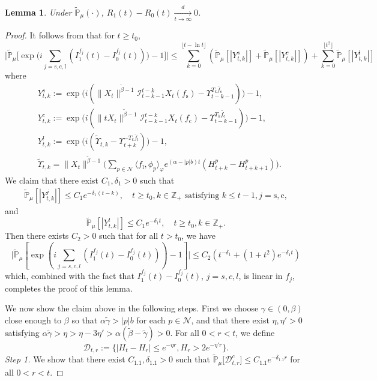 \documentclass[12pt,a4paper]{amsart}
\theoremstyle{plain}
\newtheorem{lem}[thm]{Lemma}
\theoremstyle{definition}
\numberwithin{equation}{section}
\begin{document}
\begin{lem}\label{lem: U1-U0T}
Under $\mathbb{\widetilde{P}}_{\mu}(\cdot)$,
 $R_1(t)-R_0(t)\xrightarrow[t\to \infty]{d}0$.
\end{lem}
\begin{proof}
It follows from \cite[Lemma 3.4.3]{Durrett2010Probability} that for $t\geq t_0$,
\[
\Big|\widetilde {\mathbb P}_{\mu}\Big[\exp\Big(i
\sum_{j=\mathrm s,\mathrm c,\mathrm l}(I_{1}^{f_j}(t) - I_0^{f_j}(t))\Big)
 - 1\Big]\Big| \leq  \sum_{k=0}^{\lfloor t-\ln t \rfloor}(\widetilde {\mathbb {P}}_\mu[|Y^s_{t,k}|] + \widetilde {\mathbb {P}}_\mu[|Y^c_{t,k}|] )+ \sum_{k=0}^{\lfloor t^2 \rfloor} \widetilde {\mathbb {P}}_\mu[|Y^l_{t,k}|]
\]
 where
 \begin{align}
 &Y^s_{t,k} := \exp\Big(i(\|X_t\|^{\tilde{\beta}-1}\mathcal I_{t-k-1}^{t-k}X_t(f_\mathrm s) - \Upsilon_{t-k-1}^{T_{k}\widetilde {f_\mathrm s}})\Big) - 1, \\
 &Y^c_{t,k} := \exp\Big(i(\|tX_t\|^{\tilde{\beta}-1}\mathcal I_{t-k-1}^{t-k}X_t(f_\mathrm c) - \Upsilon_{t-k-1}^{T_{k}\widetilde {f_\mathrm c}})\Big) - 1,\\
&Y^l_{t,k} := \exp\Big(i(\widetilde{\Upsilon}_{t,k} - \Upsilon_{t+k}^{-T_{k}\widetilde {f_\mathrm l}})\Big) - 1,\\
&\widetilde{\Upsilon}_{t,k}=\|X_t\|^{\tilde{\beta}-1}\Big( \sum_{p\in \mathcal N}\langle f_\mathrm l,\phi_p\rangle_{\varphi}e^{(\alpha-|p|b)t}(H_{t+k}^p-H_{t+k+1}^p)\Big).
\end{align}
  We claim that there exist $C_1, \delta_1>0$ such that
\begin{align}
 \widetilde {\mathbb {P}}_\mu[|Y^j_{t,k}|]
 \leq C_1e^{-\delta_1 (t-k)}, \quad  t\geq t_0, k \in \mathbb Z_+ \text{~satisfying~} k\leq t-1,
  j=\mathrm s,\mathrm c,
\end{align}
and
\[
 \widetilde {\mathbb {P}}_\mu[|Y^l_{t,k}|] \leq C_1e^{-\delta_1 t}, \quad t\geq t_0, k \in \mathbb Z_+.
\]
  Then there exists $C_2>0$ such that for all $t>t_0$, we have
$$
\big|\widetilde {\mathbb P}_{\mu}\left[\exp\left(i\sum_{j=s,c,l}(I_{1}^{f_j}(t) - I_0^{f_j}(t))\right) - 1\right]\big| \leq C_2(t^{-\delta_1}+(1+t^2)e^{-\delta_1 t})
$$
which, combined with the fact that
$I^{f_j}_1(t) - I^{f_j}_0(t)$, $j=s,c,l$, is linear in $f_j$, completes the proof of this lemma.

  We now show the claim above in the following steps.
  First we choose $\gamma\in(0, \beta)$ close enough to $\beta$ so that $\alpha \tilde \gamma > |p|b$ for each $p\in \mathcal N$,
  and that there exist $\eta,\eta'>0$ satisfying $\alpha \tilde \gamma > \eta>\eta - 3\eta'> \alpha (\tilde \beta - \tilde \gamma)>0$.
  For all $0<r<t$, we define
\[
\mathcal{D}_{t,r} :=\{|H_t-H_{r}|\leq  e^{-\eta r}, H_{r}> 2e^{-\eta' r}\}.
\]
 \emph{Step 1.} We show that there exist $C_{1.1},\delta_{1.1} >0$ such that
$\mathbb{\widetilde{P}}_{\mu} \big[ \mathcal{D}^c_{t,r} \big] \leq C_{1.1} e^{-\delta_{1.1} r}$ for all $0<r<t$.



\end{proof}
\end{document}
